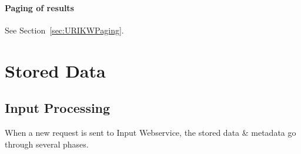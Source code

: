 \subsubsection{Paging of results}
See Section~\ref{sec:URIKWPaging}.



\chapter{Stored Data}
\section{Input Processing}
\label{sec:inputProcessing}
When a new request is sent to Input Webservice, the stored data \& metadata go through several phases.

